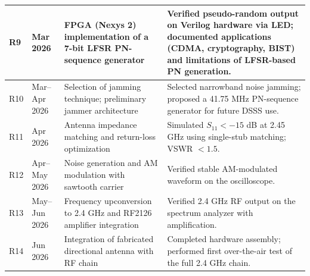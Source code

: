 \documentclass[12pt,a4paper]{report}
\begin{document}
\begin{longtable}{|p{1.5cm}|p{2cm}|p{5cm}|p{6cm}|}
		R9 & Mar 2026 &
		FPGA (Nexys 2) implementation of a 7-bit LFSR PN-sequence generator &
		Verified pseudo-random output on Verilog hardware via LED; documented applications (CDMA, cryptography, BIST) and limitations of LFSR-based PN generation. \\
		\hline
		
		R10 & Mar--Apr 2026 &
		Selection of jamming technique; preliminary jammer architecture &
		Selected narrowband noise jamming; proposed a 41.75 MHz PN-sequence generator for future DSSS use. \\
		\hline
		
		R11 & Apr 2026 &
		Antenna impedance matching and return-loss optimization &
		Simulated $S_{11} < -15$ dB at 2.45 GHz using single-stub matching; VSWR $< 1.5$. \\
		\hline
		
		R12 & Apr--May 2026 &
		Noise generation and AM modulation with sawtooth carrier &
		Verified stable AM-modulated waveform on the oscilloscope. \\
		\hline
		
		R13 & May--Jun 2026 &
		Frequency upconversion to 2.4 GHz and RF2126 amplifier integration &
		Verified 2.4 GHz RF output on the spectrum analyzer with amplification. \\
		\hline
		
		R14 & Jun 2026 &
		Integration of fabricated directional antenna with RF chain &
		Completed hardware assembly; performed first over-the-air test of the full 2.4 GHz chain. \\
		\hline
		
	\end{longtable}
\end{document}
